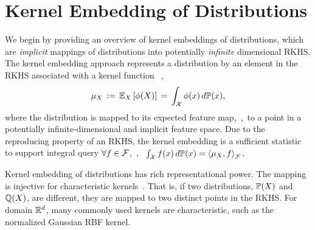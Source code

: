 \documentclass{article}
\begin{document}
%


\vspace{-3mm}
\section{Kernel Embedding of Distributions}
\label{sec:embedding}
\vspace{-3mm}

We begin by providing an overview of kernel embeddings of distributions, which are \emph{implicit} mappings of distributions into potentially \emph{infinite} dimensional RKHS.
The kernel embedding approach represents a distribution by an element in the RKHS associated with a kernel function \, \cite{SmoGreSonSch07},
\begin{align}
  \mu_{X} \, := \, \mathbb{E}_{X} \left[\phi(X)\right] \, = \, \int_{\mathcal{X}} \phi(x) \, d\mathbb{P}(x),  \label{eq:embedding}
\end{align}
where the distribution is mapped to its expected feature map,~\ie,~to a point in a potentially infinite-dimensional and implicit feature space.
Due to the reproducing property of an RKHS, the kernel embedding is a sufficient statistic to support integral query $\forall f\in\mathcal{F}$,~\ie,~
$
  \int_{\mathcal{X}} f(x)\, d\mathbb{P}(x)  = \left\langle \mu_{X},f \right\rangle_{\mathcal{F}}.
$

Kernel embedding of distributions has rich representational power. The mapping is injective for characteristic kernels~\cite{SriGreFukLanetal08}. That is, if two distributions, $\mathbb{P}(X)$ and $\mathbb{Q}(X)$, are different, they are mapped to two distinct points in the RKHS. For domain $\mathbb{R}^d$, many commonly used kernels are characteristic, such as the normalized Gaussian RBF kernel. 
\end{document}
